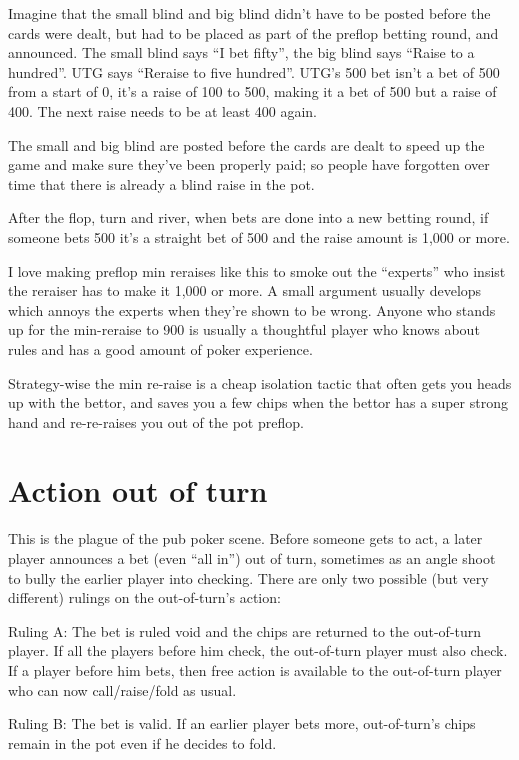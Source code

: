 Imagine that the small blind and big blind didn't have to be posted
before the cards were dealt, but had to be placed as part of the
preflop betting round, and announced. The small blind says
``I bet fifty'', the big blind says ``Raise to a hundred''.
UTG says ``Reraise to five hundred''. UTG's 500 bet isn't a bet
of 500 from a start of 0, it's a raise of 100 to 500, making it a bet
of 500 but a raise of 400. The next raise needs to be at least 400
again.

The small and big blind are posted before the cards are dealt to
speed up the game and make sure they've been properly paid; so
people have forgotten over time that there is already a blind raise
in the pot.

After the flop, turn and river, when bets are done into a new
betting round, if someone bets 500 it's a straight bet of 500
and the raise amount is 1,000 or more.

I love making preflop min reraises like this to smoke out
the ``experts'' who insist the reraiser has to make it 1,000
or more. A small argument usually develops which annoys the
experts when they're shown to be wrong. Anyone who stands
up for the min-reraise to 900 is usually a thoughtful player
who knows about rules and has a good amount of poker experience.

Strategy-wise the min re-raise is a cheap isolation tactic
that often gets you heads up with the bettor, and saves you
a few chips when the bettor has a super strong hand and
re-re-raises you out of the pot preflop.

\section{Action out of turn}

This is the plague of the pub poker scene. Before
someone gets to act, a later player announces a bet (even ``all in'')
out of turn, sometimes as an angle shoot to bully the earlier player
into checking. There are only two possible (but very different)
rulings on the out-of-turn's action:

Ruling A: The bet is ruled void and the chips are returned to the out-of-turn
player. If all the players before him check, the out-of-turn player
must also check. If a player before him bets, then free
action is available to the out-of-turn player who can now call/raise/fold
as usual.

Ruling B: The bet is valid. If an earlier player bets more, out-of-turn's chips
remain in the pot even if he decides to fold. 

